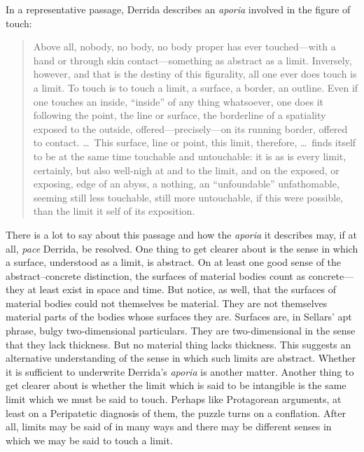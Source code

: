 In a representative passage, Derrida describes an \emph{aporia} involved in the figure of touch:
\begin{quote}
	Above all, nobody, no body, no body proper has ever touched---with a hand or through skin contact---something as abstract as a limit. Inversely, however, and that is the destiny of this figurality, all one ever does touch is a limit. To touch is to touch a limit, a surface, a border, an outline. Even if one touches an inside, ``inside'' of any thing whatsoever, one does it following the point, the line or surface, the borderline of a spatiality exposed to the outside, offered---precisely---on its running border, offered to contact. \ldots\ This surface, line or point, this limit, therefore, \ldots\ finds itself to be at the same time touchable and untouchable: it is as is every limit, certainly, but also well-nigh at and to the limit, and on the exposed, or exposing, edge of an abyss, a nothing, an ``unfoundable'' unfathomable, seeming still less touchable, still more untouchable, if this were possible, than the limit it self of its exposition. \citep[103--4]{Derrida:2005aa}
\end{quote}
There is a lot to say about this passage and how the \emph{aporia} it describes may, if at all, \emph{pace} Derrida, be resolved. One thing to get clearer about is the sense in which a surface, understood as a limit, is abstract. On at least one good sense of the abstract--concrete distinction, the surfaces of material bodies count as concrete---they at least exist in space and time. But notice, as well, that the surfaces of material bodies could not themselves be material. They are not themselves material parts of the bodies whose surfaces they are. Surfaces are, in Sellars' \citeyearpar[\textsc{iv} 23]{Sellars:1956xp} apt phrase, bulgy two-dimensional particulars. They are two-dimensional in the sense that they lack thickness. But no material thing lacks thickness. This suggests an alternative understanding of the sense in which such limits are abstract. Whether it is sufficient to underwrite Derrida's \emph{aporia} is another matter. Another thing to get clearer about is whether the limit which is said to be intangible is the same limit which we must be said to touch. Perhaps like Protagorean arguments, at least on a Peripatetic diagnosis of them, the puzzle turns on a conflation. After all, limits may be said of in many ways and there may be different senses in which we may be said to touch a limit.


